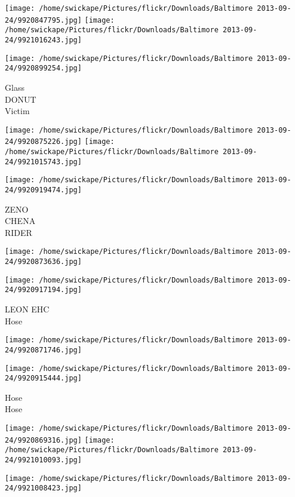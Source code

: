 \documentclass[10pt,letterpaper]{article}
\begin{document}
\texttt{[image: /home/swickape/Pictures/flickr/Downloads/Baltimore 2013-09-24/9920847795.jpg]}
\texttt{[image: /home/swickape/Pictures/flickr/Downloads/Baltimore 2013-09-24/9921016243.jpg]}

\vspace{0.25in}
\texttt{[image: /home/swickape/Pictures/flickr/Downloads/Baltimore 2013-09-24/9920899254.jpg]}

Glass\\
DONUT\\
Victim
\pagebreak

\texttt{[image: /home/swickape/Pictures/flickr/Downloads/Baltimore 2013-09-24/9920875226.jpg]}
\texttt{[image: /home/swickape/Pictures/flickr/Downloads/Baltimore 2013-09-24/9921015743.jpg]}

\vspace{0.25in}
\texttt{[image: /home/swickape/Pictures/flickr/Downloads/Baltimore 2013-09-24/9920919474.jpg]}

ZENO\\
CHENA\\
RIDER
\pagebreak

\texttt{[image: /home/swickape/Pictures/flickr/Downloads/Baltimore 2013-09-24/9920873636.jpg]}

\vspace{0.25in}
\texttt{[image: /home/swickape/Pictures/flickr/Downloads/Baltimore 2013-09-24/9920917194.jpg]}

LEON EHC\\
Hose
\pagebreak

\texttt{[image: /home/swickape/Pictures/flickr/Downloads/Baltimore 2013-09-24/9920871746.jpg]}

\vspace{0.25in}
\texttt{[image: /home/swickape/Pictures/flickr/Downloads/Baltimore 2013-09-24/9920915444.jpg]}

Hose\\
Hose
\pagebreak

\texttt{[image: /home/swickape/Pictures/flickr/Downloads/Baltimore 2013-09-24/9920869316.jpg]}
\texttt{[image: /home/swickape/Pictures/flickr/Downloads/Baltimore 2013-09-24/9921010093.jpg]}

\vspace{0.25in}
\texttt{[image: /home/swickape/Pictures/flickr/Downloads/Baltimore 2013-09-24/9921008423.jpg]}
\end{document}
